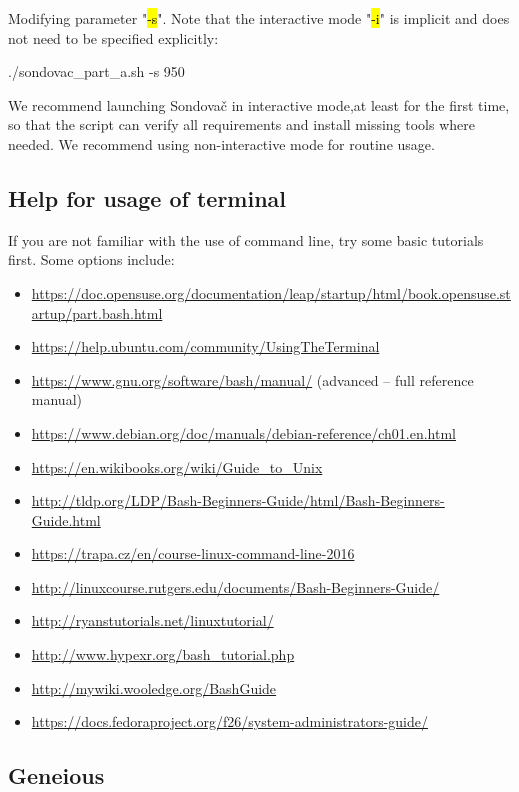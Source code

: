 \documentclass[a4paper, 11pt, twoside]{article}
\renewcommand{\texttt}[1]{\hl{\ttfamily #1}}
\begin{document}
Modifying parameter "\texttt{-s}". Note that the interactive mode "\texttt{-i}" is implicit and does not need to be specified explicitly:

\begin{bashcode}
  ./sondovac_part_a.sh -s 950
\end{bashcode}

We recommend launching Sondovač in interactive mode,at least for the first time, so that the script can verify all requirements and install missing tools where needed. We recommend using non-interactive mode for routine usage.

\subsection{Help for usage of terminal}

If you are not familiar with the use of command line, try some basic tutorials first. Some options include:

\begin{itemize}
  \item \url{https://doc.opensuse.org/documentation/leap/startup/html/book.opensuse.startup/part.bash.html}
  \item \url{https://help.ubuntu.com/community/UsingTheTerminal}
  \item \url{https://www.gnu.org/software/bash/manual/} (advanced -- full reference manual)
  \item \url{https://www.debian.org/doc/manuals/debian-reference/ch01.en.html}
  \item \url{https://en.wikibooks.org/wiki/Guide_to_Unix}
  \item \url{http://tldp.org/LDP/Bash-Beginners-Guide/html/Bash-Beginners-Guide.html}
  \item \url{https://trapa.cz/en/course-linux-command-line-2016}
  \item \url{http://linuxcourse.rutgers.edu/documents/Bash-Beginners-Guide/}
  \item \url{http://ryanstutorials.net/linuxtutorial/}
  \item \url{http://www.hypexr.org/bash_tutorial.php}
  \item \url{http://mywiki.wooledge.org/BashGuide}
  \item \url{https://docs.fedoraproject.org/f26/system-administrators-guide/}
\end{itemize}

\subsection{Geneious}
\label{geneious}
\end{document}
